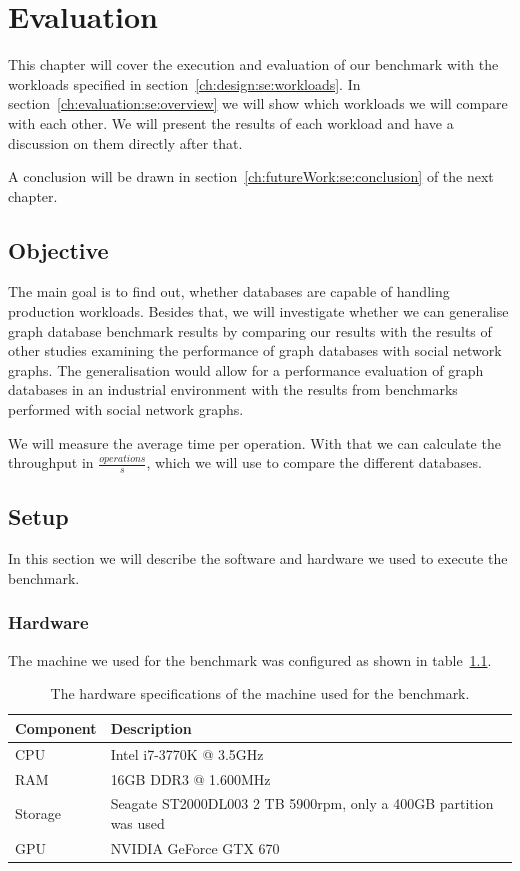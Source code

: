 \chapter{Evaluation}
\label{ch:evaluation}
This chapter will cover the execution and evaluation of our benchmark with the workloads specified in section~\ref{ch:design:se:workloads}.
In section~\ref{ch:evaluation:se:overview} we will show which workloads we will compare with each other.
We will present the results of each workload and have a discussion on them directly after that.

A conclusion will be drawn in section~\ref{ch:futureWork:se:conclusion} of the next chapter.

\section{Objective}
The main goal is to find out,
whether databases are capable of handling production workloads.
Besides that,
we will investigate whether we can generalise graph database benchmark results by comparing our results with the results of other studies examining the performance of graph databases with social network graphs.
The generalisation would allow for a performance evaluation of graph databases in an industrial environment with the results from benchmarks performed with social network graphs.

We will measure the average time per operation.
With that we can calculate the throughput in $ \frac{operations}{s} $,
which we will use to compare the different databases.

\section{Setup}
In this section we will describe the software and hardware we used to execute the benchmark.

\subsection{Hardware}
The machine we used for the benchmark was configured as shown in table~\ref{tab:hardware}.

\begin{table}[!h]
  \begin{minipage}{\textwidth}
    \begin{tabularx}{\textwidth}{ | l | X | }
      \hline
      Component & Description \\ \hline \hline
      CPU & Intel i7-3770K @ 3.5GHz \\ \hline
      RAM & 16GB DDR3 @ 1.600MHz \\ \hline
      Storage & Seagate ST2000DL003 2 TB 5900rpm, only a 400GB partition was used \\ \hline
      GPU & NVIDIA GeForce GTX 670 \\ \hline
    \end{tabularx}
  \end{minipage}
  \caption{The hardware specifications of the machine used for the benchmark.}
  \label{tab:hardware}
\end{table}

